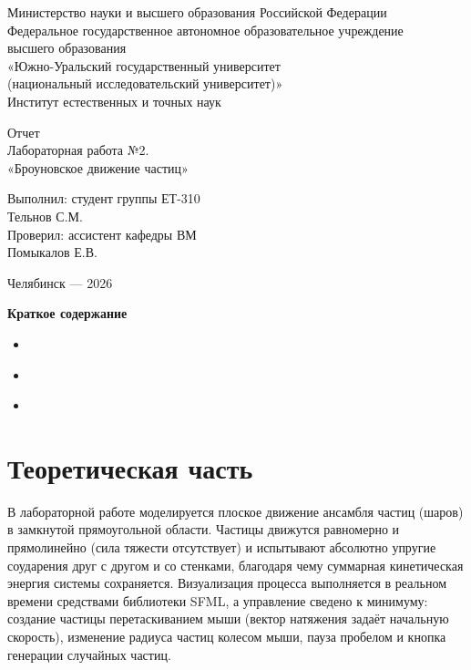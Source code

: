 \documentclass[a4paper]{article}
\newcommand{\mainsection}[1]{%
    \phantomsection
    \section*{\centering\fontsize{16pt}{0pt}\selectfont\textbf{#1}}%
}
\begin{document}
\centering
Министерство науки и высшего образования Российской Федерации\\
Федеральное государственное автономное образовательное учреждение\\
высшего образования\\
«Южно-Уральский государственный университет\\
(национальный исследовательский университет)»\\
Институт естественных и точных наук

\setlength{\parskip}{7.5cm}

Отчет\\
Лабораторная работа №2.\\
«Броуновское движение частиц»

\setlength{\parskip}{5.9cm}

\raggedleft
\begin{minipage}{0.46\textwidth}
\raggedright
Выполнил: студент группы ЕТ-310\\
Тельнов С.М.\\
Проверил: ассистент кафедры ВМ\\
Помыкалов Е.В.
\end{minipage}

\setlength{\parskip}{5.9cm}

\centering
Челябинск — 2026

\setlength{\parskip}{0pt plus 1pt}
\newpage

\centering
\textbf{Краткое содержание}
\begin{itemize}
    \setlength{\parskip}{0.4cm}
    \item \hyperref[sec:theory]{ \dotfill \pageref{sec:theory}}
    \item \hyperref[sec:practice]{ \dotfill \pageref{sec:practice}}
    \item \hyperref[sec:conclusion]{ \dotfill \pageref{sec:conclusion}}
\end{itemize}
\newpage

\setlength{\parindent}{1.5em}

\raggedright

\mainsection{Теоретическая часть}
\label{sec:theory}

В лабораторной работе моделируется плоское движение ансамбля частиц (шаров) в замкнутой прямоугольной области. Частицы движутся равномерно и прямолинейно (сила тяжести отсутствует) и испытывают абсолютно упругие соударения друг с другом и со стенками, благодаря чему суммарная кинетическая энергия системы сохраняется. Визуализация процесса выполняется в реальном времени средствами библиотеки SFML, а управление сведено к минимуму: создание частицы перетаскиванием мыши (вектор натяжения задаёт начальную скорость), изменение радиуса частиц колесом мыши, пауза пробелом и кнопка генерации случайных частиц.
\end{document}
